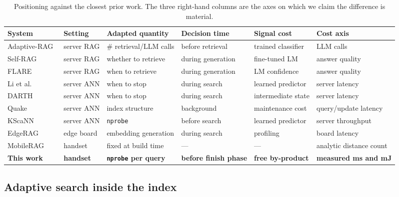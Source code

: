 \documentclass[journal]{IEEEtran}
\newcommand{\nprobe}{\texttt{nprobe}}
\begin{document}
\begin{table}[!t]
\caption{Positioning against the closest prior work. The three right-hand
columns are the axes on which we claim the difference is material.}
\label{tab:positioning}
\centering
\begin{tabular}{llllll}
\toprule
System & Setting & Adapted quantity & Decision time & Signal cost & Cost axis \\
\midrule
Adaptive-RAG~\cite{jeong2024adaptiverag} & server RAG & \# retrieval/LLM calls & before retrieval & trained classifier & LLM calls \\
Self-RAG~\cite{asai2024selfrag} & server RAG & whether to retrieve & during generation & fine-tuned LM & answer quality \\
FLARE~\cite{jiang2023flare} & server RAG & when to retrieve & during generation & LM confidence & answer quality \\
Li et al.~\cite{li2020earlytermination} & server ANN & when to stop & during search & learned predictor & server latency \\
DARTH~\cite{chatzakis2026darth} & server ANN & when to stop & during search & intermediate state & server latency \\
Quake~\cite{mohoney2025quake} & server ANN & index structure & background & maintenance cost & query/update latency \\
KScaNN~\cite{senkevich2025kscann} & server ANN & \nprobe{} & before search & learned predictor & server throughput \\
EdgeRAG~\cite{seemakhupt2024edgerag} & edge board & embedding generation & during search & profiling & board latency \\
MobileRAG~\cite{park2025mobilerag} & handset & fixed at build time & --- & --- & analytic distance count \\
\textbf{This work} & \textbf{handset} & \textbf{\nprobe{} per query} & \textbf{before finish phase} & \textbf{free by-product} & \textbf{measured ms and mJ} \\
\bottomrule
\end{tabular}
\end{table}

\subsection{Adaptive search inside the index}
\end{document}
